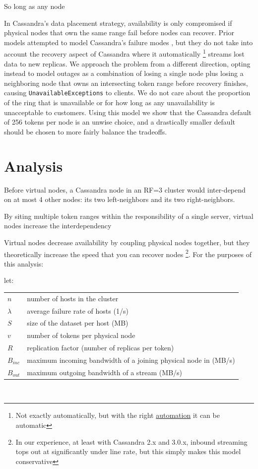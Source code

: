 \documentclass{article}
\makeatletter
\newenvironment{conditions}[1][let:]
  {#1 \begin{tabular}[t]{>{$}l<{$} @{${}={}$} l}}
  {\end{tabular}\\[\belowdisplayskip]}
\makeatother
\begin{document}
So long as any node


In Cassandra's data placement strategy, availability is only compromised if physical nodes that own the same range fail before nodes can recover. Prior models attempted to model Cassandra's failure modes \cite{dataloss}, but they do not take into account the recovery aspect of Cassandra where it automatically \footnote{Not exactly automatically, but with the right \href{https://github.com/Netflix/Priam}{automation} it can be automatic} streams lost data to new replicas. We approach the problem from a different direction, opting instead to model outages as a combination of losing a single node plus losing a neighboring node that owns an intersecting token range before recovery finishes, causing \texttt{UnavailableExceptions} to clients. We do not care about the proportion of the ring that is unavailable or for how long as any unavailability is unacceptable to customers. Using this model we show that the Cassandra default of 256 tokens per node is an unwise choice, and a drastically smaller default should be chosen to more fairly balance the tradeoffs.

\section{Analysis}
Before virtual nodes, a Cassandra node in an RF=3 cluster would inter-depend on at most 4 other nodes: its two left-neighbors and its two right-neighbors.

By siting multiple token ranges within the responsibility of a single server, virtual nodes increase the interdependency

Virtual nodes decrease availability by coupling physical nodes together, but they theoretically increase the speed that you can recover nodes \footnote{In our experience, at least with Cassandra 2.x and 3.0.x, inbound streaming tops out at significantly under line rate, but this simply makes this model conservative}. For the purposes of this analysis:

\begin{conditions}
 n       &  number of hosts in the cluster \\
 \lambda &  average failure rate of hosts (1/s) \\
 S       &  size of the dataset per host (MB) \\
 v       &  number of tokens per physical node \\
 R       &  replication factor (number of replicas per token) \\
 B_{inc} &  maximum incoming bandwidth of a joining physical node in (MB/s) \\
 B_{out} &  maximum outgoing bandwidth of a stream (MB/s) \\
\end{conditions}
\end{document}
